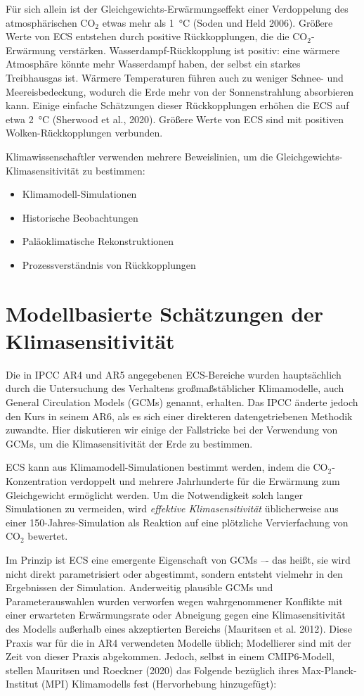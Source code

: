 \documentclass[12pt,paper=a4,DIV=12,parskip=never,chapterprefix=false,headings=standardclasses]{scrreprt}
\begin{document}
Für sich allein ist der Gleichgewichts-Erwärmungseffekt einer Verdoppelung des atmosphärischen CO$_2$ etwas mehr als \SI{1}{\celsius} (Soden und Held 2006). Größere Werte von ECS entstehen durch positive Rückkopplungen, die die CO$_2$-Erwärmung verstärken. Wasserdampf-Rückkopplung ist positiv: eine wärmere Atmosphäre könnte mehr Wasserdampf haben, der selbst ein starkes Treibhausgas ist. Wärmere Temperaturen führen auch zu weniger Schnee- und Meereisbedeckung, wodurch die Erde mehr von der Sonnenstrahlung absorbieren kann. Einige einfache Schätzungen dieser Rückkopplungen erhöhen die ECS auf etwa \SI{2}{\celsius} (Sherwood et al., 2020). Größere Werte von ECS sind mit positiven Wolken-Rückkopplungen verbunden.

Klimawissenschaftler verwenden mehrere Beweislinien, um die Gleichgewichts-Klima\-sensitivität zu bestimmen:
\begin{itemize}
\item  Klimamodell-Simulationen
\item  Historische Beobachtungen  
\item  Paläoklimatische Rekonstruktionen
\item  Prozessverständnis von Rückkopplungen
\end{itemize}

\section{Modellbasierte Schätzungen der Klimasensitivität}
Die in IPCC AR4 und AR5 angegebenen ECS-Bereiche wurden hauptsächlich durch die Untersuchung des Verhaltens großmaßstäblicher Klimamodelle, auch General Circulation Models (GCMs) genannt, erhalten. Das IPCC änderte jedoch den Kurs in seinem AR6, als es sich einer direkteren datengetriebenen Methodik zuwandte. Hier diskutieren wir einige der Fallstricke bei der Verwendung von GCMs, um die Klimasensitivität der Erde zu bestimmen.

ECS kann aus Klimamodell-Simulationen bestimmt werden, indem die CO$_2$-Konzentration verdoppelt und mehrere Jahrhunderte für die Erwärmung zum Gleichgewicht ermöglicht werden. Um die Notwendigkeit solch langer Simulationen zu vermeiden, wird \emph{effektive Klimasensitivität} üblicherweise aus einer 150-Jahres-Simulation als Reaktion auf eine plötzliche Vervierfachung von CO$_2$ bewertet.

Im Prinzip ist ECS eine emergente Eigenschaft von GCMs –- das heißt, sie wird nicht direkt parametrisiert oder abgestimmt, sondern entsteht vielmehr in den Ergebnissen der Simulation. Anderweitig plausible GCMs und Parameterauswahlen wurden verworfen wegen wahrgenommener Konflikte mit einer erwarteten Erwärmungsrate oder Abneigung gegen eine Klimasensitivität des Modells außerhalb eines akzeptierten Bereichs (Mauritsen et al. 2012). Diese Praxis war für die in AR4 verwendeten Modelle üblich; Modellierer sind mit der Zeit von dieser Praxis abgekommen. Jedoch, selbst in einem CMIP6-Modell, stellen Mauritsen und Roeckner (2020) das Folgende bezüglich ihres Max-Planck-Institut (MPI) Klimamodells fest (Hervorhebung hinzugefügt):
\end{document}
